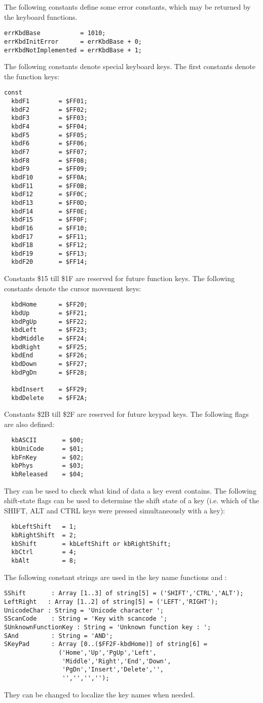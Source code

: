 The following constants define some error constants, which may be returned
by the keyboard functions.
\begin{verbatim}
errKbdBase           = 1010;
errKbdInitError      = errKbdBase + 0;
errKbdNotImplemented = errKbdBase + 1;
\end{verbatim}
The following constants denote special keyboard keys. The first constants
denote the function keys:
\begin{verbatim}
const
  kbdF1        = $FF01;
  kbdF2        = $FF02;
  kbdF3        = $FF03;
  kbdF4        = $FF04;
  kbdF5        = $FF05;
  kbdF6        = $FF06;
  kbdF7        = $FF07;
  kbdF8        = $FF08;
  kbdF9        = $FF09;
  kbdF10       = $FF0A;
  kbdF11       = $FF0B;
  kbdF12       = $FF0C;
  kbdF13       = $FF0D;
  kbdF14       = $FF0E;
  kbdF15       = $FF0F;
  kbdF16       = $FF10;
  kbdF17       = $FF11;
  kbdF18       = $FF12;
  kbdF19       = $FF13;
  kbdF20       = $FF14;
\end{verbatim}
Constants  \$15 till \$1F are reserved for future function keys. The
following constants denote the cursor movement keys:
\begin{verbatim}
  kbdHome      = $FF20;
  kbdUp        = $FF21;
  kbdPgUp      = $FF22;
  kbdLeft      = $FF23;
  kbdMiddle    = $FF24;
  kbdRight     = $FF25;
  kbdEnd       = $FF26;
  kbdDown      = $FF27;
  kbdPgDn      = $FF28;

  kbdInsert    = $FF29;
  kbdDelete    = $FF2A;
\end{verbatim}
Constants \$2B till \$2F are reserved for future keypad keys.
The following flags are also defined:
\begin{verbatim}
  kbASCII       = $00;
  kbUniCode     = $01;
  kbFnKey       = $02;
  kbPhys        = $03;
  kbReleased    = $04;
\end{verbatim}
They can be used to check what kind of data a key event contains.
The following shift-state flags can be used to determine the shift state of
a key (i.e. which of the SHIFT, ALT and CTRL keys were pressed
simultaneously with a key):
\begin{verbatim}
  kbLeftShift   = 1;
  kbRightShift  = 2;
  kbShift       = kbLeftShift or kbRightShift;
  kbCtrl        = 4;
  kbAlt         = 8;
\end{verbatim}
The following constant strings are used in the key name functions 
 and :
\begin{verbatim}
SShift       : Array [1..3] of string[5] = ('SHIFT','CTRL','ALT');
LeftRight   : Array [1..2] of string[5] = ('LEFT','RIGHT');
UnicodeChar : String = 'Unicode character ';
SScanCode    : String = 'Key with scancode ';
SUnknownFunctionKey : String = 'Unknown function key : ';
SAnd         : String = 'AND';
SKeyPad      : Array [0..($FF2F-kbdHome)] of string[6] = 
               ('Home','Up','PgUp','Left',
                'Middle','Right','End','Down',
                'PgDn','Insert','Delete','',
                '','','','');
\end{verbatim}
They can be changed to localize the key names when needed.

